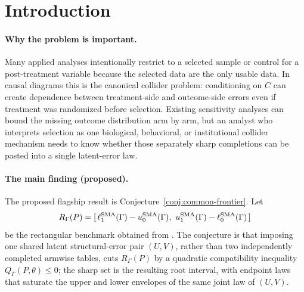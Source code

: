 \documentclass[11pt]{article}
\theoremstyle{definition}
\theoremstyle{plain}
\theoremstyle{remark}
\begin{document}
\begin{abstract}
Conditioning on a post-treatment collider, mediator, or selection indicator is a familiar source of bias, but the sharp-set object relevant for target-population ATEs is not the rectangular one-arm missing-outcome bound alone.  \citet{ScharfsteinManskiAnthony2004Bounds} already gives the armwise class-based benchmark under bounded selection-bias log odds ratios.  This revised proposal asks whether a stronger common structural-error model, in which both treatment arms are generated from the same latent outcome rank and collider rank with treatment-specific threshold maps, creates a nonrectangular sharp ATE frontier inside that rectangular benchmark.  The flagship kernel is Conjecture~\ref{conj:common-frontier}: a computable quadratic compatibility inequality \(Q_\Gamma(P,\theta)\le 0\) whose roots give the sharp ATE endpoints and whose strict interior cut separates this proposal from the Scharfstein--Manski--Anthony armwise construction on an open set of observed laws.  Resolving it would turn qualitative collider-bias warnings into a sensitivity curve that reports both the published rectangular benchmark and the additional price of requiring a single latent collider mechanism across treatment arms.
\end{abstract}

\section{Introduction}
\paragraph{Why the problem is important.}
Many applied analyses intentionally restrict to a selected sample or control for a post-treatment variable because the selected data are the only usable data.  In causal diagrams this is the canonical collider problem: conditioning on \(C\) can create dependence between treatment-side and outcome-side errors even if treatment was randomized before selection.  Existing sensitivity analyses can bound the missing outcome distribution arm by arm, but an analyst who interprets selection as one biological, behavioral, or institutional collider mechanism needs to know whether those separately sharp completions can be pasted into a single latent-error law.

\paragraph{The main finding (proposed).}
The proposed flagship result is Conjecture~\ref{conj:common-frontier}.  Let
\[
  R_\Gamma(P)=[\,\ell_1^{\rm SMA}(\Gamma)-u_0^{\rm SMA}(\Gamma),\
  u_1^{\rm SMA}(\Gamma)-\ell_0^{\rm SMA}(\Gamma)\,]
\]
be the rectangular benchmark obtained from \citet{ScharfsteinManskiAnthony2004Bounds}.  The conjecture is that imposing one shared latent structural-error pair \((U,V)\), rather than two independently completed armwise tables, cuts \(R_\Gamma(P)\) by a quadratic compatibility inequality \(Q_\Gamma(P,\theta)\le 0\); the sharp set is the resulting root interval, with endpoint laws that saturate the upper and lower envelopes of the same joint law of \((U,V)\).
\end{document}
